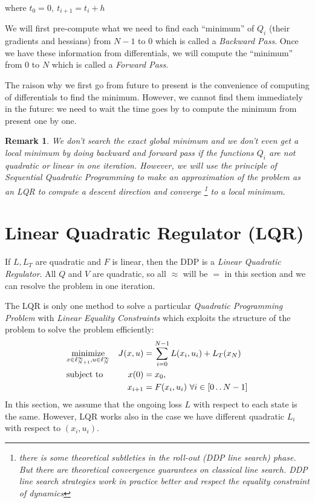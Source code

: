 \documentclass{report}
\newtheorem*{remark}{Remark}
\newcommand{\twodots}{\mathinner {\ldotp \ldotp}}
\begin{document}
where $t_0 = 0, \ t_{i+1} = t_i + h  $

We will first pre-compute what we need to find each ``minimum'' of $Q_i$ (their gradients and hessians) from $N-1$ to $0$ which is called a \emph{Backward Pass}. Once we have these information from differentials, we will compute the ``minimum'' from $0$ to $N$ which is called a \emph{Forward Pass}.

The raison why we first go from future to present is the convenience of computing of differentials to find the minimum. However, we cannot find them immediately in the future: we need to wait the time goes by to compute the minimum from present one by one.

\begin{remark}	
	We don't search the exact global minimum and we don't even get a local minimum by doing backward and forward pass if the functions $Q_i$ are not quadratic or linear in one iteration. However, we will use the principle of \emph{Sequential Quadratic Programming} to make an approximation of the problem as an LQR to compute a descent direction and converge \footnote{there is some theoretical subtleties in the roll-out (DDP line search) phase. But there are theoretical convergence guarantees on classical line search. DDP line search strategies work in practice better and respect the equality constraint of dynamics} to a local minimum.
\end{remark}
\section{Linear Quadratic Regulator (LQR)}
If $L, L_T$ are quadratic and $F$ is linear, then the DDP is a \emph{Linear Quadratic Regulator}. All $Q$ and $V$ are quadratic, so all $\approx$ will be $=$ in this section and we can resolve the problem in one iteration.

The LQR is only one method to solve a particular \emph{Quadratic Programming Problem} with \emph{Linear Equality Constraints} which exploits the structure of the problem to solve the problem efficiently:
\begin{equation}
\begin{aligned}
&\underset{x \in \ell_{N+1}^\infty, u \in \ell_{N}^\infty}{\text{minimize}}          &J(x, u) &=\sum_{i = 0}^{N-1} L(x_i, u_i) + L_T(x_N) \\
&\text{subject to}       &x(0)      &= x_0,  \\ %
&							      &x_{i+1}  &= F(x_i, u_i) \ \forall i \in [0 \twodots N-1]
\end{aligned}
\end{equation}
In this section, we assume that the ongoing loss $L$ with respect to each state is the same. However, LQR works also in the case we have different quadratic $L_i$ with respect to $(x_i, u_i)$.
\end{document}
